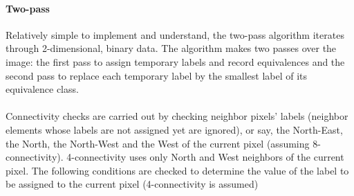 \documentclass{article}
\begin{document}
	\paragraph{Two-pass}
	Relatively simple to implement and understand, the two-pass algorithm iterates through 2-dimensional, binary data. The algorithm makes two passes over the image: the first pass to assign temporary labels and record equivalences and the second pass to replace each temporary label by the smallest label of its equivalence class.

	\paragraph{}
	Connectivity checks are carried out by checking neighbor pixels' labels (neighbor elements whose labels are not assigned yet are ignored), or say, the North-East, the North, the North-West and the West of the current pixel (assuming 8-connectivity). 4-connectivity uses only North and West neighbors of the current pixel. The following conditions are checked to determine the value of the label to be assigned to the current pixel (4-connectivity is assumed)\\
\end{document}
